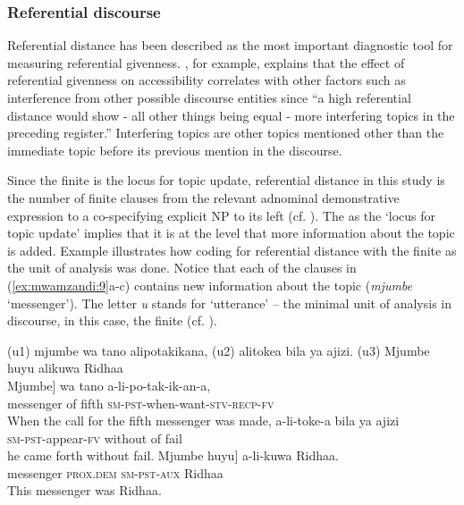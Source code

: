 \documentclass[output=paper,
modfonts
]{langscibook}
\begin{document}
\subsubsection{Referential discourse}\label{sec:mwamzandi:2.2.2}

Referential distance has been described as the most important diagnostic tool for measuring referential givenness. \citet[36]{Givón1983}, for example, explains that the effect of referential givenness on accessibility correlates with other factors such as interference from other possible discourse entities since “a high referential distance would show - all other things being equal - more interfering topics in the preceding register.” Interfering topics are other topics mentioned other than the immediate topic before its previous mention in the discourse.

Since the finite  is the locus for topic update, referential distance in this study is the number of finite clauses from the relevant adnominal demonstrative expression to a co-specifying explicit NP to its left (cf. \citealt{Kameyama1998,PoesioEtAl2004,TaboadaZabala2008}). The  as the ‘locus for topic update’ implies that it is at the  level that more information about the topic is added. Example  illustrates how coding for referential distance with the finite  as the unit of analysis was done. Notice that each of the clauses in (\ref{ex:mwamzandi:9}a-c) contains new information about the topic (\textit{mjumbe} ‘messenger’). The letter \textit{u} stands for ‘utterance’ – the minimal unit of analysis in discourse, in this case, the finite  (cf. \citealt{GroszEtAl1995}).

\ea\label{ex:mwamzandi:9}
\ea 
(u1) mjumbe wa tano alipotakikana, (u2) alitokea bila ya ajizi. (u3) Mjumbe huyu alikuwa Ridhaa\\
\gll {\ob}Mjumbe] wa tano a-li-po-tak-ik-an-a,\\
     {\db}messenger of fifth \textsc{sm}{}-\textsc{pst}{}-when-want-\textsc{stv}{}-\textsc{recp}{}-\textsc{fv}\\
\glt When the call for the fifth messenger was made,
\ex
\gll  a-li-toke-a bila ya ajizi\\
     \textsc{sm}{}-\textsc{pst}{}-appear-\textsc{fv} without of fail\\
\glt he came forth without fail.
\ex
\gll {\ob}Mjumbe huyu] a-li-kuwa Ridhaa.\\
     {\db}messenger \textsc{prox}.\textsc{dem} \textsc{sm}{}-\textsc{pst}{}-\textsc{aux} Ridhaa\\
\glt This messenger was Ridhaa.
\z
\z
\end{document}
